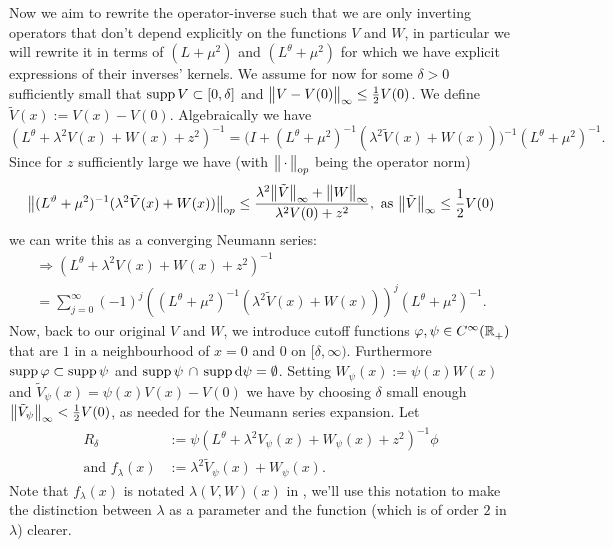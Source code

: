 Now we aim to rewrite the operator-inverse such that we are only inverting
operators that don't depend explicitly on the functions $V$ and $W$, in
particular we will rewrite it in terms of $(L+\mu^2)$ and $(L^\theta+\mu^2)$ for
which we have explicit expressions of their inverses' kernels. We assume for now
for some $\delta > 0$ sufficiently small that $\operatorname{supp} V \subset [0,\delta]$ and
$\bigl\|V-V(0)\bigr\|_{\infty}\leq \frac12V(0)$. We define $\tilde V(x) := V(x) - V(0)$.
Algebraically we have
\begin{equation*}
  (L^\theta + \lambda^2 V(x) + W(x) + z^2)^{-1} =
    \bigl(I + (L^\theta + \mu^2)^{-1}(\lambda^2\tilde V(x) + W(x))\bigr)^{-1}
    (L^\theta + \mu^2)^{-1}.
\end{equation*}
Since for $z$ sufficiently large we have (with $\bigl\|\,\cdot\,\bigr\|_{\mathrm op}$ being the
operator norm)
\begin{align*}
  \bigl\|(L^\vartheta + \mu^2)^{-1}(\lambda^2\tilde V(x) + W(x))\bigr\|_{\mathrm op} \leq
  \frac{\lambda^2\bigl\|\tilde V\bigr\|_{\infty} + \bigl\|W\bigr\|_{\infty}}{\lambda^2 V(0) + z^2},
  \text{ as } \bigl\|\tilde V\bigr\|_{\infty} \leq \frac12V(0)
\end{align*}
we can write this as a converging Neumann series:
\begin{multline}
  \label{frm:neumann-sum}
  \Rightarrow (L^\theta + \lambda^2 V(x) + W(x) + z^2)^{-1} \\ =
    \sum_{j=0}^\infty (-1)^j \left((L^\theta + \mu^2)^{-1}(\lambda^2\tilde V(x)
    + W(x))\right)^j (L^\theta + \mu^2)^{-1}.
\end{multline}
Now, back to our original $V$ and $W$, we introduce cutoff functions $\varphi,
\psi\in C^\infty_{}({\mathbb{R}_+^{}})$ that are $1$ in a neighbourhood of $x = 0$ and $0$ on
$[\delta,\infty)$. Furthermore $\operatorname{supp}\varphi\subset\operatorname{supp}\psi$ and
$\operatorname{supp}\psi\,\cap\,\operatorname{supp}\mathrm d\psi = \emptyset$. Setting $W_\psi(x) :=
\psi(x)W(x)$ and $\tilde V_\psi(x) = \psi(x)V(x) - V(0)$ we have by choosing
$\delta$ small enough $\bigl\|\tilde V_\psi\bigr\|_{\infty} < \frac12V(0)$, as needed for the
Neumann series expansion. Let
\begin{align}
  \label{frm:r-delta}
  R_\delta &:= \psi(L^\theta + \lambda^2V_\psi(x) + W_\psi(x) + z^2)^{-1}\phi \\
  \label{def:f-lambda}
  \text{and } f_\lambda(x) &:= \lambda^2\tilde V_\psi(x) + W_\psi(x).
\end{align}
Note that $f_\lambda(x)$ is notated $\lambda(V,W)(x)$ in \cite{LV13}, we'll use
this notation to make the distinction between $\lambda$ as a parameter and the
function (which is of order $2$ in $\lambda$) clearer.

